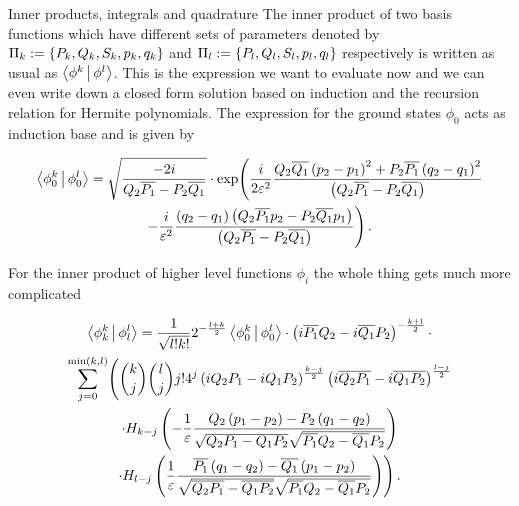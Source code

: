 \begin{chapter}{Inner products, integrals and quadrature}
The inner product of two basis functions which have different sets of
parameters denoted by $\Pi_k := \{P_k, Q_k, S_k, p_k, q_k\}$ and
$\Pi_l := \{P_l, Q_l, S_l, p_l, q_l\}$ respectively is written as usual as
$\Braket{ \phi^k | \phi^l }$. This is the expression we want to evaluate now and
we can even write down a closed form solution based on induction and the recursion
relation for Hermite polynomials. The expression for the ground states $\phi_0$
acts as induction base and is given by

\begin{multline} \label{eq:multifamily_innerp_ground}
  \Braket{ \phi_0^k | \phi_0^l } =
  \sqrt{\frac{-2 i}{Q_2 \overline{P_1} - P_2 \overline{Q_1}}} \cdot
    \exp \Biggl(
      \frac{i}{2 \varepsilon^2}
      \frac{Q_2 \overline{Q_1} \left(p_2-p_1\right)^2 + P_2 \overline{P_1} \left(q_2-q_1\right)^2}
            {\left(Q_2 \overline{P_1} - P_2 \overline{Q_1}\right)}
    \\
    -\frac{i}{\varepsilon^2}
    \frac{\left(q_2-q_1\right) \left( Q_2 \overline{P_1} p_2 - P_2 \overline{Q_1} p_1\right)}
         {\left(Q_2 \overline{P_1} - P_2 \overline{Q_1}\right)}
    \Biggr) \,.
\end{multline}

For the inner product of higher level functions $\phi_i$ the whole thing gets much
more complicated

\begin{multline} \label{eq:mixing_braket}
  \Braket{ \phi_k^k | \phi_l^l } =
  \frac{1}{\sqrt{l!k!}} 2^{-\frac{l+k}{2}} \Braket{ \phi_0^k | \phi_0^l } \cdot
  \left(i \overline{ P_1} Q_2 - i \overline{Q_1} P_2\right)^{-\frac{k+l}{2}} \cdot \\
  \sum_{j=0}^{\min\left(k,l\right)}
    \Biggl(
      \binom{k}{j} \binom{l}{j} j! 4^j
      \left(i Q_2  P_1 - i Q_1  P_2\right)^{\frac{k-j}{2}}
      \left(i \overline{Q_2 P_1} - i\overline{Q_1 P_2}\right)^{\frac{l-j}{2}}
      \\
      \cdot H_{k-j}\left(-\frac{1}{\varepsilon}
                    \frac{Q_2\left(p_1-p_2\right)-P_2\left(q_1-q_2\right)}
                         {\sqrt{Q_2 P_1 - Q_1 P_2}\sqrt{\overline{P_1}Q_2-\overline{Q_1} P_2}}\right)
      \\
      \cdot H_{l-j}\left(\frac{1}{\varepsilon}
                   \frac{\overline{ P_1}\left(q_1-q_2\right)-\overline{Q_1}\left(p_1-p_2\right)}
                        {\sqrt{\overline{Q_2 P_1}-\overline{Q_1 P_2}}\sqrt{\overline{ P_1}Q_2-\overline{Q_1} P_2}}\right)
    \Biggr) \,.
\end{multline}


\end{chapter}
